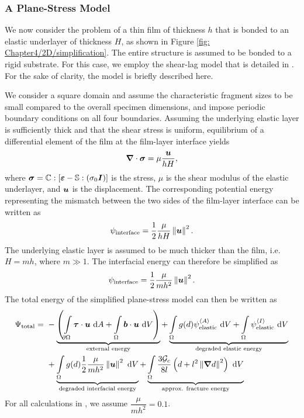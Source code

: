 \subsubsection{A Plane-Stress Model}

We now consider the problem of a thin film of thickness $h$ that is bonded to an elastic underlayer of thickness $H$, as shown in Figure \ref{fig: Chapter4/2D/simplification}.  The entire structure is assumed to be bonded to a rigid substrate. For this case, we employ the shear-lag model that is detailed in \cite{liang2003evolving}.  For the sake of clarity, the model is briefly described here.



We consider a square domain and assume the characteristic fragment sizes to be small compared to the overall specimen dimensions, and impose periodic boundary conditions on all four boundaries. Assuming the underlying elastic layer is sufficiently thick and that the shear stress is uniform, equilibrium of a differential element of the film at the film-layer interface yields
\begin{align}
  \boldsymbol{\nabla} \cdot \boldsymbol{\sigma} = \mu \dfrac{\boldsymbol{u}}{hH} ,
\end{align}
where $\boldsymbol{\sigma} = \mathbb{C}:[\boldsymbol{\varepsilon} - \mathbb{S}:(\sigma_0\boldsymbol{I})]$ is the stress, $\mu$ is the shear modulus of the elastic underlayer, and $\boldsymbol{u}$ is the displacement. The corresponding potential energy representing the mismatch between the two sides of the film-layer interface can be written as
\begin{align}
  \psi_{\text{interface}} = \dfrac{1}{2}\dfrac{\mu}{hH}\left\lVert\boldsymbol{u}\right\rVert^2 .
\end{align}
The underlying elastic layer is assumed to be much thicker than the film, i.e.\ $H = mh$, where $m \gg 1$. The interfacial energy can therefore be simplified as
\begin{align}
  \psi_{\text{interface}} = \dfrac{1}{2}\dfrac{\mu}{mh^2}\left\lVert\boldsymbol{u}\right\rVert^2.
\end{align}
The total energy of the simplified plane-stress model can then be written as
\begin{equation}
  \begin{split}
    \Psi_{\text{total}} = &\ -\underbrace{\left( \int\limits_{\partial \Omega} \boldsymbol{\tau} \cdot \boldsymbol{u} \text{ d}A + \int\limits_\Omega \boldsymbol{b} \cdot \boldsymbol{u} \text{ d}V \right)}_{\text{external energy}} + \underbrace{\int\limits_\Omega g(d)\psi_{\text{elastic}}^{\left< A \right>} \text{ d}V + \int\limits_\Omega\psi_{\text{elastic}}^{\left< I \right>} \text{ d}V}_{\text{degraded elastic energy}} \\
    &\ + \underbrace{\int\limits_\Omega g(d)\dfrac{1}{2}\dfrac{\mu}{mh^2}\left\lVert\boldsymbol{u}\right\rVert^2 \text{ d}V}_{\text{degraded interfacial energy}} + \underbrace{\int\limits_\Omega \dfrac{3\mathcal{G}_c}{8l} \left( d + l^2 \left\lVert\boldsymbol{\nabla} d\right\rVert^2 \right) \text{ d}V}_{\text{approx. fracture energy}}
  \end{split}
\end{equation}
For all calculations in , we assume $\dfrac{\mu}{mh^2} = 0.1$.

